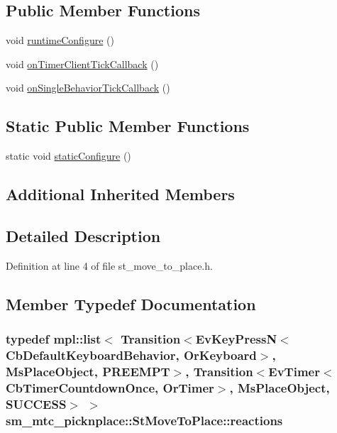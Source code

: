 \subsection*{Public Member Functions}
\begin{DoxyCompactItemize}
\item 
void \hyperlink{structsm__mtc__picknplace_1_1StMoveToPlace_a46b4bede19ae1599521d286c8192c691}{runtime\+Configure} ()
\item 
void \hyperlink{structsm__mtc__picknplace_1_1StMoveToPlace_af7daf7999a0633cc6e89c8590b57e3bd}{on\+Timer\+Client\+Tick\+Callback} ()
\item 
void \hyperlink{structsm__mtc__picknplace_1_1StMoveToPlace_aaf61ef11f091c8af978e99d73e964e08}{on\+Single\+Behavior\+Tick\+Callback} ()
\end{DoxyCompactItemize}
\subsection*{Static Public Member Functions}
\begin{DoxyCompactItemize}
\item 
static void \hyperlink{structsm__mtc__picknplace_1_1StMoveToPlace_acabcb1c2cba44d794de35cbf8cbf35d9}{static\+Configure} ()
\end{DoxyCompactItemize}
\subsection*{Additional Inherited Members}


\subsection{Detailed Description}


Definition at line 4 of file st\+\_\+move\+\_\+to\+\_\+place.\+h.



\subsection{Member Typedef Documentation}
\subsubsection[{\texorpdfstring{reactions}{reactions}}]{\setlength{\rightskip}{0pt plus 5cm}typedef mpl\+::list$<$ Transition$<$Ev\+Key\+PressN$<$Cb\+Default\+Keyboard\+Behavior, {\bf Or\+Keyboard}$>$, {\bf Ms\+Place\+Object}, {\bf P\+R\+E\+E\+M\+PT}$>$, Transition$<$Ev\+Timer$<$Cb\+Timer\+Countdown\+Once, {\bf Or\+Timer}$>$, {\bf Ms\+Place\+Object}, {\bf S\+U\+C\+C\+E\+SS}$>$ $>$ {\bf sm\+\_\+mtc\+\_\+picknplace\+::\+St\+Move\+To\+Place\+::reactions}}\hypertarget{structsm__mtc__picknplace_1_1StMoveToPlace_a1fb980fed2ad4dafceeaf244b516690e}{}\label{structsm__mtc__picknplace_1_1StMoveToPlace_a1fb980fed2ad4dafceeaf244b516690e}


